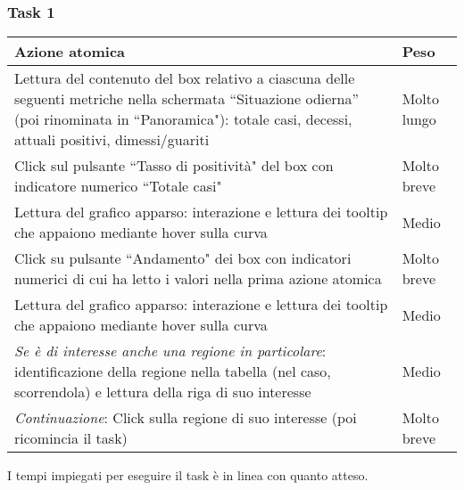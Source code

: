 \subsubsection{Task 1}
\label{sss:iaa-task-1}
{
\renewcommand{\arraystretch}{2}
\begin{longtable}[h]{| p{14cm} | p{2.5cm} |}
    \hline
    \textbf{Azione atomica} & \textbf{Peso} \\
    \hline
    \endhead
    Lettura del contenuto del box relativo a ciascuna delle seguenti metriche nella schermata ``Situazione odierna'' (poi rinominata in ``Panoramica"): totale casi, decessi, attuali positivi, dimessi/guariti & Molto lungo \\
    \hline
    Click sul pulsante ``Tasso di positività" del box con indicatore numerico ``Totale casi" & Molto breve \\
    \hline
    Lettura del grafico apparso: interazione e lettura dei tooltip che appaiono mediante hover sulla curva & Medio \\
    \hline
    Click su pulsante ``Andamento" dei box con indicatori numerici di cui ha letto i valori nella prima azione atomica & Molto breve \\
    \hline
    Lettura del grafico apparso: interazione e lettura dei tooltip che appaiono mediante hover sulla curva & Medio \\
    \hline
    \textit{Se è di interesse anche una regione in particolare}: identificazione della regione nella tabella (nel caso, scorrendola) e lettura della riga di suo interesse & Medio \\
    \hline
    \textit{Continuazione}: Click sulla regione di suo interesse (poi ricomincia il task) & Molto breve \\
    \hline
\end{longtable}
}
I tempi impiegati per eseguire il task è in linea con quanto atteso.